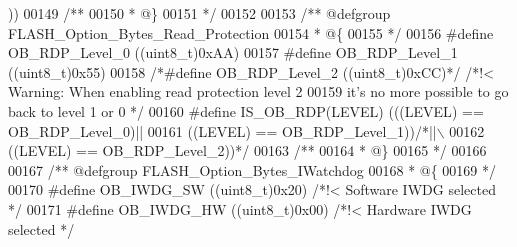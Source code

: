 \begin{DoxyCode}
{      )}\textcolor{preprocessor}{)}
00149 \textcolor{comment}{/**}
00150 \textcolor{comment}{  * @\}}
00151 \textcolor{comment}{  */}
00152 
00153 \textcolor{comment}{/** @defgroup FLASH\_Option\_Bytes\_Read\_Protection }
00154 \textcolor{comment}{  * @\{}
00155 \textcolor{comment}{  */}
00156 \textcolor{preprocessor}{#}\textcolor{preprocessor}{define} \textcolor{preprocessor}{OB\_RDP\_Level\_0}   \textcolor{preprocessor}{(}\textcolor{preprocessor}{(}\textcolor{preprocessor}{uint8\_t}\textcolor{preprocessor}{)}0xAA\textcolor{preprocessor}{)}
00157 \textcolor{preprocessor}{#}\textcolor{preprocessor}{define} \textcolor{preprocessor}{OB\_RDP\_Level\_1}   \textcolor{preprocessor}{(}\textcolor{preprocessor}{(}\textcolor{preprocessor}{uint8\_t}\textcolor{preprocessor}{)}0x55\textcolor{preprocessor}{)}
00158 \textcolor{comment}{/*#define OB\_RDP\_Level\_2   ((uint8\_t)0xCC)*/} \textcolor{comment}{/*!< Warning: When enabling read protection level 2 }
00159 \textcolor{comment}{                                                  it's no more possible to go back to level 1 or 0 */}
00160 \textcolor{preprocessor}{#}\textcolor{preprocessor}{define} \textcolor{preprocessor}{IS\_OB\_RDP}\textcolor{preprocessor}{(}\textcolor{preprocessor}{LEVEL}\textcolor{preprocessor}{)} \textcolor{preprocessor}{(}\textcolor{preprocessor}{(}\textcolor{preprocessor}{(}\textcolor{preprocessor}{LEVEL}\textcolor{preprocessor}{)} \textcolor{preprocessor}{==} OB_RDP_Level_0\textcolor{preprocessor}{)}\textcolor{preprocessor}{||}
00161                           \textcolor{preprocessor}{(}\textcolor{preprocessor}{(}\textcolor{preprocessor}{LEVEL}\textcolor{preprocessor}{)} \textcolor{preprocessor}{==} OB_RDP_Level_1\textcolor{preprocessor}{)}\textcolor{preprocessor}{)}\textcolor{comment}{/*||\(\backslash\)}
00162 \textcolor{comment}{                          ((LEVEL) == OB\_RDP\_Level\_2))*/}
00163 \textcolor{comment}{/**}
00164 \textcolor{comment}{  * @\}}
00165 \textcolor{comment}{  */}
00166 
00167 \textcolor{comment}{/** @defgroup FLASH\_Option\_Bytes\_IWatchdog }
00168 \textcolor{comment}{  * @\{}
00169 \textcolor{comment}{  */}
00170 \textcolor{preprocessor}{#}\textcolor{preprocessor}{define} \textcolor{preprocessor}{OB\_IWDG\_SW}                     \textcolor{preprocessor}{(}\textcolor{preprocessor}{(}\textcolor{preprocessor}{uint8\_t}\textcolor{preprocessor}{)}0x20\textcolor{preprocessor}{)}  \textcolor{comment}{/*!< Software IWDG selected */}
00171 \textcolor{preprocessor}{#}\textcolor{preprocessor}{define} \textcolor{preprocessor}{OB\_IWDG\_HW}                     \textcolor{preprocessor}{(}\textcolor{preprocessor}{(}\textcolor{preprocessor}{uint8\_t}\textcolor{preprocessor}{)}0x00\textcolor{preprocessor}{)}  \textcolor{comment}{/*!< Hardware IWDG selected */}

\end{DoxyCode}
